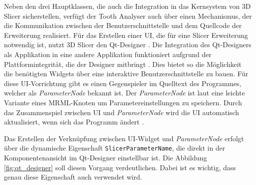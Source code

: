 Neben den drei Hauptklassen, die auch die Integration in das Kernsystem von 3D Slicer
sicherstellen, verfügt der Tooth Analyser auch über einen Mechanismus, der die Kommunikation
zwischen der Benutzerschnittstelle und dem Quellcode der Erweiterung realisiert.
Für das Erstellen einer \ac{UI}, die für eine Slicer Erweiterung notwendig ist, nutzt
3D Slicer den Qt-Designer \citep[vgl.][]{qt2024}. Die Integration des Qt-Designers
als Applikation in eine andere Applikation funktioniert aufgrund der Plattformintegrität,
die der Designer mitbringt \citep[vgl.][]{qt2024}. Dies bietet so die
Möglichkeit die benötigten Widgets über eine interaktive Benutzerschnittstelle
zu bauen. Für diese \ac{UI}-Vorrichtung gibt es einen Gegenspieler im Quelltext
des Programmes, welcher als \textit{ParameterNode} bekannt ist. Der \textit{ParameterNode}
ist laut \citet{slicer2024} eine leichte Variante eines \ac{MRML}-Knoten um
Parametereinstellungen zu speichern. Durch das Zusammenspiel zwischen \ac{UI}
und \textit{ParameterNode} wird die \ac{UI} automatisch aktualisiert, wenn sich das
Programm ändert \citep[vgl.][]{slicer2024}.

Das Erstellen der Verknüpfung zwischen \ac{UI}-Widget und \textit{ParameterNode}
erfolgt über die dynamische Eigenschaft \texttt{SlicerParameterName}, die direkt
in der Komponentenansicht im Qt-Designer einstellbar ist. Die Abbildung \ref{fig:qt_designer}
soll diesen Vorgang verdeutlichen. Dabei ist es wichtig, dass genau diese Eigenschaft
auch verwendet wird.

